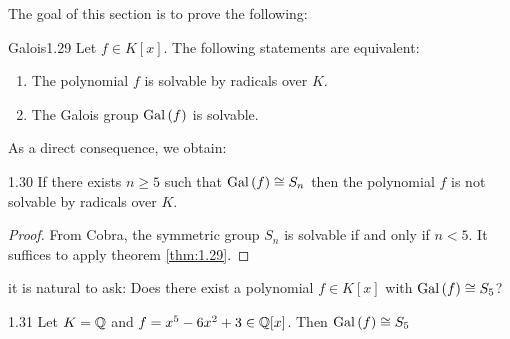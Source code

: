 \documentclass[twoside = false,	%
		headsepline,		%
		parskip = true,
		]{scrbook}						%
\begin{document}
        The goal of this section is to prove the following:
        \begin{theorem}{Galois}{1.29}
            Let $f\in K[x]$. The following statements are equivalent:
            \begin{enumerate}
                \item The polynomial $f$ is solvable by radicals over $K$.
                \item The Galois group $\mathrm{Gal}\left( f\right)$ is solvable.
            \end{enumerate}
        \end{theorem}
        As a direct consequence, we obtain:
        \begin{corollary}{}{1.30}
            If there exists $n\geq 5$ such that $\mathrm{Gal}\left( f\right)\cong S_n$ then the polynomial $f$ is not solvable by radicals over $K$.
        \end{corollary}
        \begin{proof}
        From Cobra, the symmetric group $S_n$ is solvable if and only if $n<5$. It suffices to apply theorem \ref{thm:1.29}.
        \end{proof}
        it is natural to ask: Does there exist a polynomial $f\in K[x]$ with $\mathrm{Gal}\left( f\right)\cong S_5$?
        \begin{proposition}{}{1.31}
            Let $K=\mathbb Q$ and $f=x^5-6x^2+3\in\mathbb Q[x]$. Then $\mathrm{Gal}\left( f\right) \cong S_5$
        \end{proposition}
\end{document}
